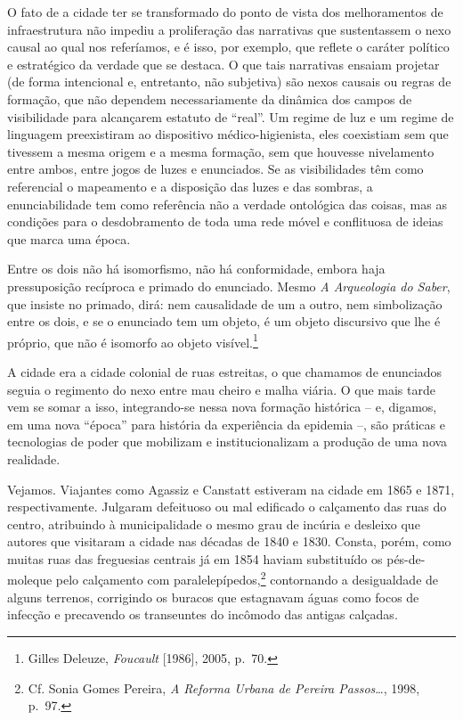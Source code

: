 O fato de a cidade ter se transformado do ponto de vista dos
melhoramentos de infraestrutura não impediu a proliferação das
narrativas que sustentassem o nexo causal ao qual nos referíamos, e é
isso, por exemplo, que reflete o caráter político e estratégico da
verdade que se destaca. O que tais narrativas ensaiam projetar (de forma
intencional e, entretanto, não subjetiva) são nexos causais ou regras de
formação, que não dependem necessariamente da dinâmica dos campos de
visibilidade para alcançarem estatuto de ``real''. Um regime de luz e um
regime de linguagem preexistiram ao dispositivo médico-higienista, eles
coexistiam sem que tivessem a mesma origem e a mesma formação, sem que
houvesse nivelamento entre ambos, entre jogos de luzes e enunciados. Se
as visibilidades têm como referencial o mapeamento e a disposição das
luzes e das sombras, a enunciabilidade tem como referência não a verdade
ontológica das coisas, mas as condições para o desdobramento de toda uma
rede móvel e conflituosa de ideias que marca uma época.

Entre os dois não há isomorfismo, não há conformidade, embora haja
pressuposição recíproca e primado do enunciado. Mesmo \emph{A
Arqueologia do Saber}, que insiste no primado, dirá: nem causalidade de
um a outro, nem simbolização entre os dois, e se o enunciado tem um
objeto, é um objeto discursivo que lhe é próprio, que não é isomorfo ao
objeto visível.\footnote{Gilles Deleuze, \emph{Foucault} {[}1986{]},
  2005, p.~70.}

A cidade era a cidade colonial de ruas estreitas, o que chamamos de
enunciados seguia o regimento do nexo entre mau cheiro e malha viária. O
que mais tarde vem se somar a isso, integrando-se nessa nova formação
histórica -- e, digamos, em uma nova ``época'' para história da
experiência da epidemia --, são práticas e tecnologias de poder que
mobilizam e institucionalizam a produção de uma nova realidade.

Vejamos. Viajantes como Agassiz e Canstatt estiveram na cidade em 1865 e
1871, respectivamente. Julgaram defeituoso ou mal edificado o calçamento
das ruas do centro, atribuindo à municipalidade o mesmo grau de incúria
e desleixo que autores que visitaram a cidade nas décadas de 1840 e
1830. Consta, porém, como muitas ruas das freguesias centrais já em 1854
haviam substituído os pés-de-moleque pelo calçamento com
paralelepípedos,\footnote{Cf. Sonia Gomes Pereira, \emph{A Reforma
  Urbana de Pereira Passos}\ldots{}, 1998, p.~97.} contornando a
desigualdade de alguns terrenos, corrigindo os buracos que estagnavam
águas como focos de infecção e precavendo os transeuntes do incômodo das
antigas calçadas.

